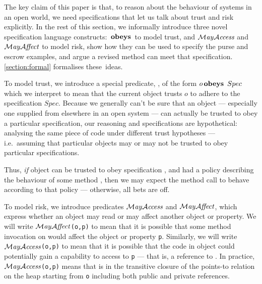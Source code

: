 
The key claim of this paper is that, to reason about the behaviour of
systems in an open world, we need specifications that let us talk
about trust and risk explicitly.  In the rest of this section, we
informally introduce three novel specification language constructs:
$\,\textbf{\textrm{obeys}}\,$ to model trust, and $\mathcal{M}\textrm{\textit{ay}}{\mathcal{A}}\textrm{\textit{ccess}}$ and $\mathcal{M}\textrm{\textit{ay}}{\mathcal{A}}\textrm{\textit{ffect}}$ to model
risk, show how they can be used to specify the purse and escrow
examples, and argue a revised  method can meet that
specification. \autoref{section:formal} formalises these~ideas.

To model trust, we introduce a special predicate, \obeys, of the
form $o \,\textbf{\textrm{obeys}}\,\ Spec$  which we interpret to mean that
the current object trusts $o$ to adhere to the specification $Spec$.
%
%
Because we generally can't be sure that an object --- especially one
supplied from elsewhere in an open system --- can actually be trusted
to obey a particular specification, our reasoning and specifications
are hypothetical: analysing the same piece of code
under different trust hypotheses --- i.e.\
assuming that particular objects may or may not be trusted to
obey particular specifications.

Thus, {\em if} object  can be trusted to obey specification
, and \prg{Spec} had a policy describing the behaviour of
some method \prg{m}, then we may expect the method call 
to behave according to that policy --- otherwise, all bets are off.




To model risk, we introduce predicates $\mathcal{M}\textrm{\textit{ay}}{\mathcal{A}}\textrm{\textit{ccess}}$ and $\mathcal{M}\textrm{\textit{ay}}{\mathcal{A}}\textrm{\textit{ffect}}$, which
express whether an object may read or may affect another object or
property. We will write
%
$\mathcal{M}\textrm{\textit{ay}}{\mathcal{A}}\textrm{\textit{ffect}}$\lstinline+(o,p)+
%
to mean that it is possible that some method invocation on  would
affect the object or property \lstinline+p+. Similarly, we will write
%
$\mathcal{M}\textrm{\textit{ay}}{\mathcal{A}}\textrm{\textit{ccess}}$\lstinline+(o,p)+
%
to mean that it is possible that the code in object  could potentially gain
a capability to access to \lstinline+p+ --- that is, a reference to
.  In
practice, $\mathcal{M}\textrm{\textit{ay}}{\mathcal{A}}\textrm{\textit{ccess}}$\lstinline+(o,p)+ means that \prg{p} is in the
transitive closure of the points-to relation on the heap starting from
\lstinline+o+
including both public and private references.



